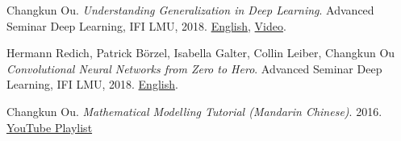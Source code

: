     \item{
      Changkun Ou.
      \emph{Understanding Generalization in Deep Learning}.
      Advanced Seminar Deep Learning, IFI LMU, 2018. \href{https://docs.google.com/presentation/d/1eNUYH9_3bbBO7bONPU8BCTr2DOMC69gdOJvBgpLjwNg/edit#slide=id.g2cdf1dbd0b_1_6}{English}, \href{https://www.youtube.com/watch?v=z9je5YlnBgI&t=1585s}{Video}.
    }   
    \item{
      Hermann Redich, Patrick Börzel, Isabella Galter, Collin Leiber, Changkun Ou
      \emph{Convolutional Neural Networks from Zero to Hero}.
      Advanced Seminar Deep Learning, IFI LMU, 2018. \href{https://github.com/changkun/talks/blob/master/201712/cnn.pdf}{English}.
    }
    \item{
        Changkun Ou.
        \emph{Mathematical Modelling Tutorial (Mandarin Chinese)}.
        2016. \href{https://www.youtube.com/watch?v=EUfXE3vP9_A&list=PLwUqqMt5en7c7iZIseCVAS5BX6RPkS-qR}{YouTube Playlist}
    }
\resumeSubHeadingListEnd
